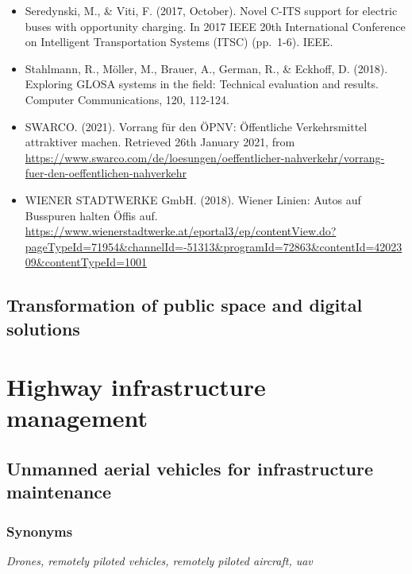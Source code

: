 \documentclass[
]{book}
\begin{document}
\begin{itemize}
\item
  Seredynski, M., \& Viti, F. (2017, October). Novel C-ITS support for electric buses with opportunity charging. In 2017 IEEE 20th International Conference on Intelligent Transportation Systems (ITSC) (pp.~1-6). IEEE.
\item
  Stahlmann, R., Möller, M., Brauer, A., German, R., \& Eckhoff, D. (2018). Exploring GLOSA systems in the field: Technical evaluation and results. Computer Communications, 120, 112-124.
\item
  SWARCO. (2021). Vorrang für den ÖPNV: Öffentliche Verkehrsmittel attraktiver machen. Retrieved 26th January 2021, from \url{https://www.swarco.com/de/loesungen/oeffentlicher-nahverkehr/vorrang-fuer-den-oeffentlichen-nahverkehr}
\item
  WIENER STADTWERKE GmbH. (2018). Wiener Linien: Autos auf Busspuren halten Öffis auf. \url{https://www.wienerstadtwerke.at/eportal3/ep/contentView.do?pageTypeId=71954\&channelId=-51313\&programId=72863\&contentId=4202309\&contentTypeId=1001}
\end{itemize}

\hypertarget{transformation-of-public-space-and-digital-solutions}{%
\section{Transformation of public space and digital solutions}\label{transformation-of-public-space-and-digital-solutions}}

\hypertarget{highway}{%
\chapter{Highway infrastructure management}\label{highway}}

\hypertarget{unmanned-aerial-vehicles-for-infrastructure-maintenance}{%
\section{Unmanned aerial vehicles for infrastructure maintenance}\label{unmanned-aerial-vehicles-for-infrastructure-maintenance}}

\hypertarget{synonyms-3}{%
\subsection*{Synonyms}\label{synonyms-3}}

\emph{Drones, remotely piloted vehicles, remotely piloted aircraft, uav}
\end{document}
